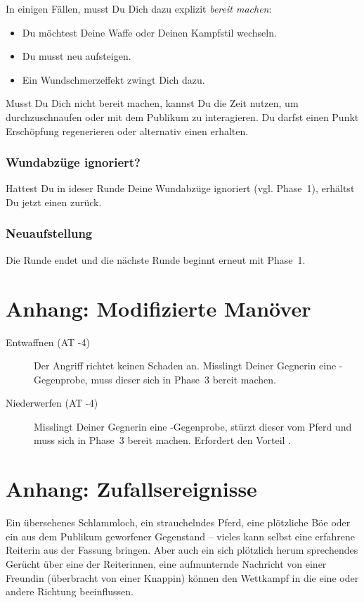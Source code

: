 \documentclass[12pt,div=calc,a5paper,parskip=half]{scrartcl}
\begin{document}
In einigen Fällen, musst Du Dich dazu explizit \emph{bereit machen}: 
\begin{itemize}
    \item Du möchtest Deine Waffe oder Deinen Kampfstil wechseln. 
    \item Du musst neu aufsteigen. 
    \item Ein Wundschmerzeffekt zwingt Dich dazu.
\end{itemize}

Musst Du Dich nicht bereit machen, kannst Du die Zeit nutzen, um durchzuschnaufen oder mit dem Publikum zu interagieren. Du darfst einen Punkt Erschöpfung regenerieren oder alternativ einen \gp erhalten. 

\subsubsection{Wundabzüge ignoriert?}
Hattest Du in ideser Runde Deine Wundabzüge ignoriert (vgl. Phase~1), erhältst Du jetzt einen \gp zurück.

\subsubsection{Neuaufstellung}
Die Runde endet und die nächste Runde beginnt erneut mit Phase~1. 

\section{Anhang: Modifizierte Manöver}
\begin{description}
    \item[Entwaffnen (AT -4)] Der Angriff richtet keinen Schaden an. Misslingt Deiner Gegnerin eine -Gegenprobe, muss dieser sich in Phase~3 bereit machen. 
    \item[Niederwerfen (AT -4)] Misslingt Deiner Gegnerin eine -Gegenprobe, stürzt dieser vom Pferd und muss sich in Phase~3 bereit machen. Erfordert den Vorteil . 
\end{description}

\section{Anhang: Zufallsereignisse}
Ein übersehenes Schlammloch, ein strauchelndes Pferd, eine plötzliche Böe oder ein aus dem Publikum geworfener Gegenstand -- vieles kann selbst eine erfahrene Reiterin aus der Fassung bringen. Aber auch ein sich plötzlich herum sprechendes Gerücht über eine der Reiterinnen, eine aufmunternde Nachricht von einer Freundin (überbracht von einer Knappin) können den Wettkampf in die eine oder andere Richtung beeinflussen. 
\end{document}
